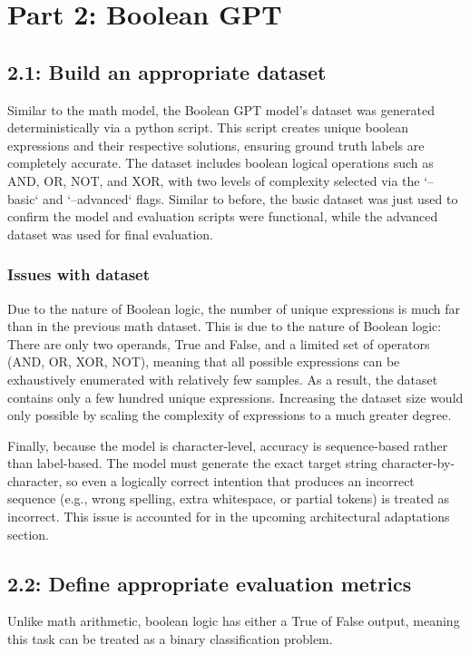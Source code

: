 \section{Part 2: Boolean GPT }

\subsection{2.1: Build an appropriate dataset}
Similar to the math model, the Boolean GPT model's dataset was generated deterministically via a python script. This script creates unique boolean expressions and their respective solutions, ensuring ground truth labels are completely accurate. The dataset includes boolean logical operations such as AND, OR, NOT, and XOR, with two levels of complexity selected via the `--basic` and `--advanced` flags. Similar to before, the basic dataset was just used to confirm the model and evaluation scripts were functional, while the advanced dataset was used for final evaluation.

\subsubsection{Issues with dataset}
Due to the nature of Boolean logic, the number of unique expressions is much far than in the previous math dataset. This is due to the nature of Boolean logic: There are only two operands, True and False, and a limited set of operators (AND, OR, XOR, NOT), meaning that all possible expressions can be exhaustively enumerated with relatively few samples. As a result, the dataset contains only a few hundred unique expressions. Increasing the dataset size would only possible by scaling the complexity of expressions to a much greater degree.  

Finally, because the model is character-level, accuracy is sequence-based rather than label-based. The model must generate the exact target string character-by-character, so even a logically correct intention that produces an incorrect sequence (e.g., wrong spelling, extra whitespace, or partial tokens) is treated as incorrect. This issue is accounted for in the upcoming architectural adaptations section.

\subsection{2.2: Define appropriate evaluation metrics}
Unlike math arithmetic, boolean logic has either a True of False output, meaning this task can be treated as a binary classification problem. 

